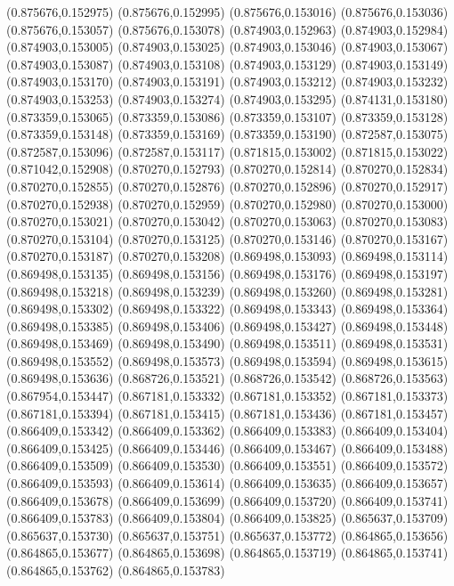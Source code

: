 (0.875676,0.152975)
(0.875676,0.152995)
(0.875676,0.153016)
(0.875676,0.153036)
(0.875676,0.153057)
(0.875676,0.153078)
(0.874903,0.152963)
(0.874903,0.152984)
(0.874903,0.153005)
(0.874903,0.153025)
(0.874903,0.153046)
(0.874903,0.153067)
(0.874903,0.153087)
(0.874903,0.153108)
(0.874903,0.153129)
(0.874903,0.153149)
(0.874903,0.153170)
(0.874903,0.153191)
(0.874903,0.153212)
(0.874903,0.153232)
(0.874903,0.153253)
(0.874903,0.153274)
(0.874903,0.153295)
(0.874131,0.153180)
(0.873359,0.153065)
(0.873359,0.153086)
(0.873359,0.153107)
(0.873359,0.153128)
(0.873359,0.153148)
(0.873359,0.153169)
(0.873359,0.153190)
(0.872587,0.153075)
(0.872587,0.153096)
(0.872587,0.153117)
(0.871815,0.153002)
(0.871815,0.153022)
(0.871042,0.152908)
(0.870270,0.152793)
(0.870270,0.152814)
(0.870270,0.152834)
(0.870270,0.152855)
(0.870270,0.152876)
(0.870270,0.152896)
(0.870270,0.152917)
(0.870270,0.152938)
(0.870270,0.152959)
(0.870270,0.152980)
(0.870270,0.153000)
(0.870270,0.153021)
(0.870270,0.153042)
(0.870270,0.153063)
(0.870270,0.153083)
(0.870270,0.153104)
(0.870270,0.153125)
(0.870270,0.153146)
(0.870270,0.153167)
(0.870270,0.153187)
(0.870270,0.153208)
(0.869498,0.153093)
(0.869498,0.153114)
(0.869498,0.153135)
(0.869498,0.153156)
(0.869498,0.153176)
(0.869498,0.153197)
(0.869498,0.153218)
(0.869498,0.153239)
(0.869498,0.153260)
(0.869498,0.153281)
(0.869498,0.153302)
(0.869498,0.153322)
(0.869498,0.153343)
(0.869498,0.153364)
(0.869498,0.153385)
(0.869498,0.153406)
(0.869498,0.153427)
(0.869498,0.153448)
(0.869498,0.153469)
(0.869498,0.153490)
(0.869498,0.153511)
(0.869498,0.153531)
(0.869498,0.153552)
(0.869498,0.153573)
(0.869498,0.153594)
(0.869498,0.153615)
(0.869498,0.153636)
(0.868726,0.153521)
(0.868726,0.153542)
(0.868726,0.153563)
(0.867954,0.153447)
(0.867181,0.153332)
(0.867181,0.153352)
(0.867181,0.153373)
(0.867181,0.153394)
(0.867181,0.153415)
(0.867181,0.153436)
(0.867181,0.153457)
(0.866409,0.153342)
(0.866409,0.153362)
(0.866409,0.153383)
(0.866409,0.153404)
(0.866409,0.153425)
(0.866409,0.153446)
(0.866409,0.153467)
(0.866409,0.153488)
(0.866409,0.153509)
(0.866409,0.153530)
(0.866409,0.153551)
(0.866409,0.153572)
(0.866409,0.153593)
(0.866409,0.153614)
(0.866409,0.153635)
(0.866409,0.153657)
(0.866409,0.153678)
(0.866409,0.153699)
(0.866409,0.153720)
(0.866409,0.153741)
(0.866409,0.153783)
(0.866409,0.153804)
(0.866409,0.153825)
(0.865637,0.153709)
(0.865637,0.153730)
(0.865637,0.153751)
(0.865637,0.153772)
(0.864865,0.153656)
(0.864865,0.153677)
(0.864865,0.153698)
(0.864865,0.153719)
(0.864865,0.153741)
(0.864865,0.153762)
(0.864865,0.153783)
